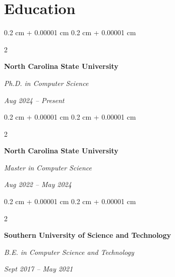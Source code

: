 \documentclass[10pt, letterpaper]{article}
\newenvironment{highlightsforbulletentries}{
    \begin{itemize}[
        topsep=0.10 cm,
        parsep=0.10 cm,
        partopsep=0pt,
        itemsep=0pt,
        leftmargin=10pt
    ]
}{
    \end{itemize}
} %
\newenvironment{onecolentry}{
    \begin{adjustwidth}{
        0.2 cm + 0.00001 cm
    }{
        0.2 cm + 0.00001 cm
    }
}{
    \end{adjustwidth}
} %
\newenvironment{twocolentry}[2][]{
    \onecolentry
    \def\secondColumn{#2}
    \setcolumnwidth{\fill, 4.5 cm}
    \begin{paracol}{2}
}{
    \switchcolumn \raggedleft \secondColumn
    \end{paracol}
    \endonecolentry
} %
\let\hrefWithoutArrow\href
\renewcommand{\href}[2]{\hrefWithoutArrow{#1}{\ifthenelse{\equal{#2}{}}{ }{#2 }\raisebox{.15ex}{\footnotesize \faExternalLink*}}}
\begin{document}



    









    \section{Education}



        
        \begin{twocolentry}{
        \textit{Aug 2024 – Present}}
            \textbf{North Carolina State University}

            \textit{Ph.D. in Computer Science}
        \end{twocolentry}

        \begin{twocolentry}{
        \textit{Aug 2022 – May 2024}}
            \textbf{North Carolina State University}

            \textit{Master in Computer Science}
        \end{twocolentry}
        \begin{twocolentry}{
        \textit{Sept 2017 – May 2021}}
            \textbf{Southern University of Science and Technology}

            \textit{B.E. in Computer Science and Technology}
        \end{twocolentry}
\end{document}
